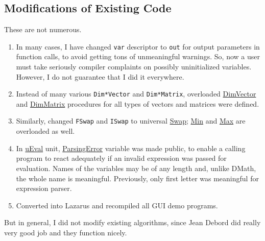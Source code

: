 \documentclass[12pt,a4paper,oneside]{report}
\newcommand{\code}[1]{\texttt{#1}}
\begin{document}
\subsection*{Modifications of Existing Code}  
These are not numerous. 
\begin{enumerate}
\item In many cases, I have changed \code{var} descriptor to \code{out} for output parameters in function calls, to avoid getting tons of unmeaningful warnings. So, now a user must take seriously compiler complaints on possibly uninitialized variables. However, I do not guarantee that I did it everywhere.
\item Instead of many various \code{Dim*Vector} and \code{Dim*Matrix}, overloaded \hyperref[utypes-DimVector]{DimVector} and \hyperref[utypes-DimMatrix]{DimMatrix} procedures for all types of vectors and matrices were defined.
\item Similarly, changed \code{FSwap} and \code{ISwap} to universal \hyperref[uminmax-Swap]{Swap}; \hyperref[uminmax-Min]{Min} and \hyperref[uminmax-Min]{Max} are overloaded as well.
\item In \hyperref[ueval]{uEval} unit, \hyperref[ueval-parsingerror]{ParsingError} variable was made public, to enable a calling program to react adequately if an invalid expression was passed for evaluation. Names of the variables may be of any length and, unlike DMath, the whole name is meaningful. Previously, only first letter was meaningful for expression parser.
\item Converted into Lazarus and recompiled all GUI demo programs.
\end{enumerate}
But in general, I did not modify existing algorithms, since Jean Debord did really very good job and they function nicely.
\end{document}
